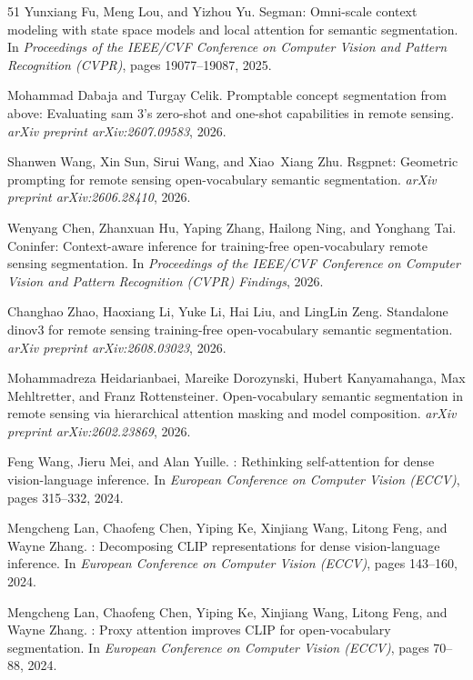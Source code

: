 \begin{thebibliography}{51}
Yunxiang Fu, Meng Lou, and Yizhou Yu.
\newblock Segman: Omni-scale context modeling with state space models and local
  attention for semantic segmentation.
\newblock In \emph{Proceedings of the IEEE/CVF Conference on Computer Vision
  and Pattern Recognition (CVPR)}, pages 19077--19087, 2025.

Mohammad Dabaja and Turgay Celik.
\newblock Promptable concept segmentation from above: Evaluating sam 3's
  zero-shot and one-shot capabilities in remote sensing.
\newblock \emph{arXiv preprint arXiv:2607.09583}, 2026.

Shanwen Wang, Xin Sun, Sirui Wang, and Xiao~Xiang Zhu.
\newblock Rsgpnet: Geometric prompting for remote sensing open-vocabulary
  semantic segmentation.
\newblock \emph{arXiv preprint arXiv:2606.28410}, 2026.

Wenyang Chen, Zhanxuan Hu, Yaping Zhang, Hailong Ning, and Yonghang Tai.
\newblock Coninfer: Context-aware inference for training-free open-vocabulary
  remote sensing segmentation.
\newblock In \emph{Proceedings of the IEEE/CVF Conference on Computer Vision
  and Pattern Recognition (CVPR) Findings}, 2026{}.

Changhao Zhao, Haoxiang Li, Yuke Li, Hai Liu, and LingLin Zeng.
\newblock Standalone dinov3 for remote sensing training-free open-vocabulary
  semantic segmentation.
\newblock \emph{arXiv preprint arXiv:2608.03023}, 2026.

Mohammadreza Heidarianbaei, Mareike Dorozynski, Hubert Kanyamahanga, Max
  Mehltretter, and Franz Rottensteiner.
\newblock Open-vocabulary semantic segmentation in remote sensing via
  hierarchical attention masking and model composition.
\newblock \emph{arXiv preprint arXiv:2602.23869}, 2026.

Feng Wang, Jieru Mei, and Alan Yuille.
: Rethinking self-attention for dense vision-language inference.
\newblock In \emph{European Conference on Computer Vision (ECCV)}, pages
  315--332, 2024.
\newblock {}

Mengcheng Lan, Chaofeng Chen, Yiping Ke, Xinjiang Wang, Litong Feng, and
  Wayne Zhang.
: Decomposing {CLIP} representations for dense
  vision-language inference.
\newblock In \emph{European Conference on Computer Vision (ECCV)}, pages
  143--160, 2024.
\newblock {}

Mengcheng Lan, Chaofeng Chen, Yiping Ke, Xinjiang Wang, Litong Feng, and
  Wayne Zhang.
: Proxy attention improves {CLIP} for open-vocabulary
  segmentation.
\newblock In \emph{European Conference on Computer Vision (ECCV)}, pages
  70--88, 2024.
\newblock {}


\end{thebibliography}
